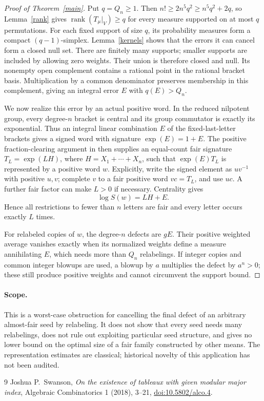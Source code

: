 \documentclass[11pt]{article}
\begin{document}
\begin{proof}[Proof of Theorem~\ref{main}]
Put $q=Q_n\ge1$. Then $n!\ge2n^5q^2\ge n^5q^2+2q$, so
Lemma~\ref{rank} gives $\operatorname{rank}(T_\mu|_V)\ge q$ for every
measure supported on at most $q$ permutations.
For each fixed support of size $q$, its probability measures form a
compact $(q-1)$-simplex. Lemma~\ref{kernels} shows that the errors it
can cancel form a closed null set. There are finitely many supports;
smaller supports are included by allowing zero weights. Their union is
therefore closed and null. Its nonempty open complement contains a
rational point in the rational bracket basis. Multiplication by a
common denominator preserves membership in this complement, giving
an integral error $E$ with $q(E)>Q_n$.

We now realize this error by an actual positive word. In the reduced
nilpotent group, every degree-$n$ bracket is central and its group
commutator is exactly its exponential. Thus an integral linear
combination $E$ of the fixed-last-letter brackets gives a signed word
with signature $\exp(E)=1+E$.
The positive fraction-clearing argument in
then supplies an equal-count fair signature $T_L=\exp(LH)$, where
$H=X_1+\cdots+X_n$, such that $\exp(E)T_L$ is represented by a
positive word $w$. Explicitly, write the signed element as $uv^{-1}$
with positive $u,v$; complete $v$ to a fair positive word $vc=T_L$,
and use $uc$. A further fair factor can make $L>0$ if necessary.
Centrality gives
\[
 \log S(w)=LH+E.
\]
Hence all restrictions to fewer than $n$ letters are fair and every
letter occurs exactly $L$ times.

For relabeled copies of $w$, the degree-$n$ defects are $gE$.
Their positive weighted average vanishes exactly when its normalized
weights define a measure annihilating $E$, which needs more than $Q_n$
relabelings. If integer copies and common integer blowups are used,
a blowup by $a$ multiplies the defect by $a^n>0$; these still produce
positive weights and cannot circumvent the support bound.
\end{proof}

\paragraph{Scope.}
This is a worst-case obstruction for cancelling the final defect of an
arbitrary almost-fair seed by relabeling. It does not show that every
seed needs many relabelings, does not rule out exploiting particular
seed structure, and gives no lower bound on the optimal size of a fair
family constructed by other means. The representation estimates are
classical; historical novelty of this application has not been audited.

\begin{thebibliography}{9}
 Joshua P.~Swanson, \emph{On the existence of tableaux
with given modular major index}, Algebraic Combinatorics 1 (2018), 3--21,
\href{https://doi.org/10.5802/alco.4}{doi:10.5802/alco.4}.
\end{thebibliography}
\end{document}
